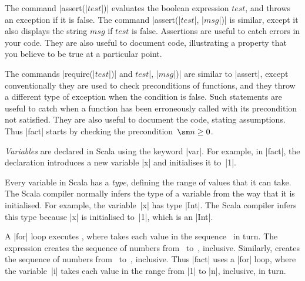 
The command |assert(|$test$|)| evaluates the boolean
expression $test$, and throws an exception if it is false.  The command
|assert(|$test$|, |$msg$|)| is similar, except it also displays the string
$msg$ if $test$ is false.  Assertions are useful to catch errors in your code.
They are also useful to document code, illustrating a property that you
believe to be true at a particular point.

The commands |require(|$test$|)| and
$test$|, |$msg$|)| are similar to |assert|, except
conventionally they are used to check preconditions of functions, and they
throw a different type of exception when the condition is false.  Such
statements are useful to catch when a function has been erroneously called
with its precondition not satisfied.  They are also useful to document the
code, stating assumptions.  Thus |fact| starts by checking the
precondition~$\sm n \ge 0$.



\emph{Variables} are declared in Scala using the keyword
|var|.  For example, in |fact|, the declaration
introduces a new variable |x| and initialises it to~|1|.

Every variable in Scala has a \emph{type}, defining the range of values that
it can take.  The Scala compiler normally infers the type of a variable from
the way that it is initialised.  For example, the variable~|x| has type |Int|.
The Scala compiler infers this type because |x| is initialised to~|1|, which
is an |Int|.
%


A |for| loop 
executes , where  takes each value in the
sequence~ in turn.  The expression 
 creates the 
sequence of numbers from~ to~, inclusive.
Similarly,  creates the sequence of numbers
from~ to~, inclusive.
%
Thus |fact| uses a |for|
loop, where the variable~|i| takes each value in the range from |1| to |n|,
inclusive, in turn.
%

